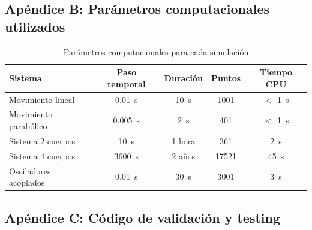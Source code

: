 \documentclass{article}
\begin{document}
\subsection{Apéndice B\@: Parámetros computacionales utilizados}

\begin{table}[H]
\centering
\caption{Parámetros computacionales para cada simulación}
\begin{tabular}{|l|c|c|c|c|}
\hline
\textbf{Sistema} & \textbf{Paso temporal} & \textbf{Duración} & \textbf{Puntos} & \textbf{Tiempo CPU} \\
\hline
Movimiento lineal & 0.01~s & 10~s & 1001 & $<$ 1~s \\
Movimiento parabólico & 0.005~s & 2~s & 401 & $<$ 1~s \\
Sistema 2 cuerpos & 10~s & 1 hora & 361 & 2~s \\
Sistema 4 cuerpos & 3600~s & 2 años & 17521 & 45~s \\
Osciladores acoplados & 0.01~s & 30~s & 3001 & 3~s \\
\hline
\end{tabular}
\end{table}

\subsection{Apéndice C\@: Código de validación y testing}
\end{document}
